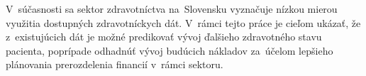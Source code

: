 
V súčasnosti sa sektor zdravotníctva na Slovensku vyznačuje nízkou mierou využitia dostupných zdravotníckych dát.  V rámci tejto práce je cieľom ukázať, že z existujúcich dát je možné predikovať vývoj ďalšieho zdravotného stavu pacienta, poprípade odhadnúť vývoj budúcich nákladov za účelom lepšieho plánovania prerozdelenia financií v rámci sektoru. 